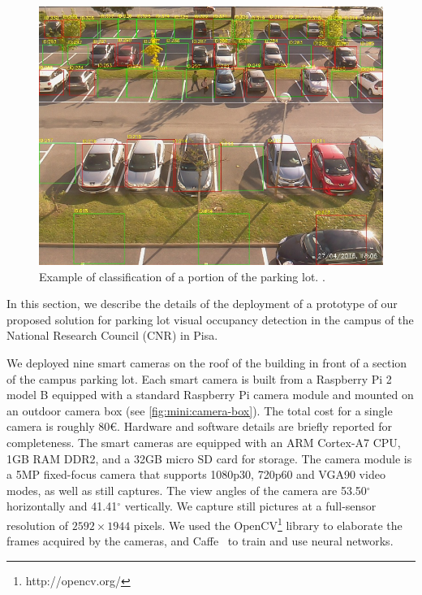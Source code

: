 \begin{figure}
	\centering
	\includegraphics[width=\columnwidth,trim={0 0 0 3.5ex},clip]{detection-example}
    \caption{Example of classification of a portion of the parking lot. .}
	\label{fig:mini:detection-example}
\end{figure}

In this section, we describe the details of the deployment of a prototype of our proposed solution for parking lot visual occupancy detection in the campus of the National Research Council (CNR) in Pisa.

We deployed nine smart cameras on the roof of the building in front of a section of the campus parking lot.
Each smart camera is built from a Raspberry Pi 2 model B equipped with a standard Raspberry Pi camera module and mounted on an outdoor camera box (see \ref{fig:mini:camera-box}).
The total cost for a single camera is roughly 80\euro.
Hardware and software details are briefly reported for completeness.
The smart cameras are equipped with an ARM Cortex-A7 CPU, 1GB RAM DDR2, and a 32GB micro SD card for storage.
The camera module is a 5MP fixed-focus camera that supports 1080p30, 720p60 and VGA90 video modes, as well as still captures.
The view angles of the camera are 53.50$^{\circ}$ horizontally and 41.41$^{\circ}$ vertically.
We capture still pictures at a full-sensor resolution of $2592 \times 1944$ pixels.
We used the OpenCV\footnote{http://opencv.org/} library to elaborate the frames acquired by the cameras, and Caffe~\cite{jia2014caffe} to train and use neural networks.

